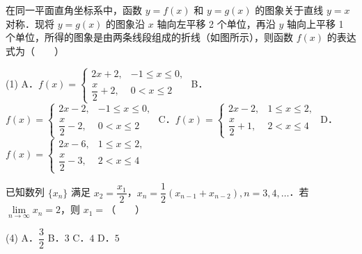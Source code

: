 \begin{question}
在同一平面直角坐标系中，函数 $y = f(x)$ 和 $y = g(x)$ 的图象关于直线 $y = x$ 对称．现将 $y = g(x)$ 的图象沿 $x$ 轴向左平移 2 个单位，再沿 $y$ 轴向上平移 1 个单位，所得的图象是由两条线段组成的折线（如图所示），则函数 $f(x)$ 的表达式为\mbox{（　　）}
\nopagebreak[4]
\begin{center}\end{center}
\nopagebreak[4]
\begin{gkopts}(1)
\task A．$f(x) = \begin{cases} 2x + 2, & -1 \leqslant x \leqslant 0, \\ \dfrac{x}{2} + 2, & 0 < x \leqslant 2 \end{cases}$
\task B．$f(x) = \begin{cases} 2x - 2, & -1 \leqslant x \leqslant 0, \\ \dfrac{x}{2} - 2, & 0 < x \leqslant 2 \end{cases}$
\task C．$f(x) = \begin{cases} 2x - 2, & 1 \leqslant x \leqslant 2, \\ \dfrac{x}{2} + 1, & 2 < x \leqslant 4 \end{cases}$
\task D．$f(x) = \begin{cases} 2x - 6, & 1 \leqslant x \leqslant 2, \\ \dfrac{x}{2} - 3, & 2 < x \leqslant 4 \end{cases}$
\end{gkopts}

\end{question}
\begin{question}
已知数列 $\{x_n\}$ 满足 $x_2 = \dfrac{x_1}{2}$，$x_n = \dfrac{1}{2}(x_{n-1} + x_{n-2}), n = 3, 4, \dots$．若 $\lim\limits_{n\to\infty} x_n = 2$，则 $x_1 =$\mbox{（　　）}

\begin{gkopts}(4)
\task A．$\dfrac{3}{2}$
\task B．$3$
\task C．$4$
\task D．$5$
\end{gkopts}

\end{question}

